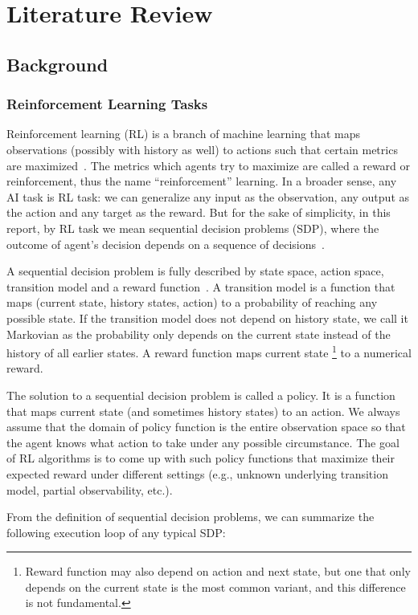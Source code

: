 \chapter{Literature Review}
\label{ch:literature-review}
\section{Background}
\subsection{Reinforcement Learning Tasks}
Reinforcement learning (RL) is a branch of machine learning that maps observations (possibly with history as well) to actions such that certain metrics are maximized~\cite{sutton-barto}. The metrics which agents try to maximize are called a reward or reinforcement, thus the name “reinforcement” learning. In a broader sense, any AI task is RL task: we can generalize any input as the observation, any output as the action and any target as the reward. But for the sake of simplicity, in this report, by RL task we mean sequential decision problems (SDP), where the outcome of agent’s decision depends on a sequence of decisions~\cite{russell}.

A sequential decision problem is fully described by state space, action space, transition model and a reward function~\cite{russell}. A transition model is a function that maps (current state, history states, action) to a probability of reaching any possible state. If the transition model does not depend on history state, we call it Markovian as the probability only depends on the current state instead of the history of all earlier states. A reward function maps current state \footnote{Reward function may also depend on action and next state, but one that only depends on the current state is the most common variant, and this difference is not fundamental.} to a numerical reward.

The solution to a sequential decision problem is called a policy. It is a function that maps current state (and sometimes history states) to an action. We always assume that the domain of policy function is the entire observation space so that the agent knows what action to take under any possible circumstance. The goal of RL algorithms is to come up with such policy functions that maximize their expected reward under different settings (e.g., unknown underlying transition model, partial observability, etc.).

From the definition of sequential decision problems, we can summarize the following execution loop of any typical SDP:

